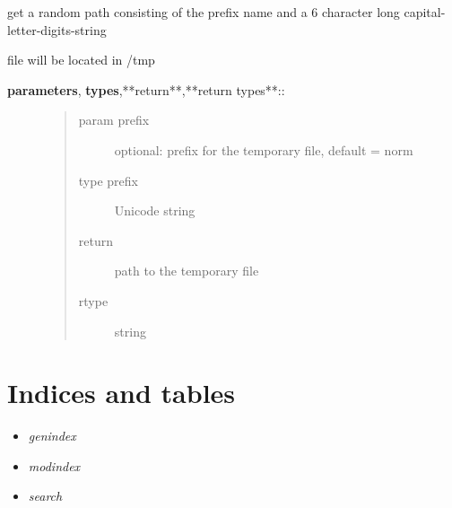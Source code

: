 \documentclass[letterpaper,10pt,english]{sphinxmanual}
\begin{document}

\begin{fulllineitems}
\label{API:norm.util.get_random_tmp_path}
get a random path consisting of the prefix name and a 6 character long capital-letter-digits-string

file will be located in /tmp
\begin{description}
\item[{\textbf{parameters}, \textbf{types},**return**,**return types**::}] \leavevmode\begin{quote}\begin{description}
\item[{param prefix}] \leavevmode
optional: prefix for the temporary file, default = norm

\item[{type prefix}] \leavevmode
Unicode string

\item[{return}] \leavevmode
path to the temporary file

\item[{rtype}] \leavevmode
string

\end{description}\end{quote}

\end{description}

\end{fulllineitems}



\chapter{Indices and tables}
\label{index:indices-and-tables}\begin{itemize}
\item {} 
\emph{genindex}

\item {} 
\emph{modindex}

\item {} 
\emph{search}

\end{itemize}
\end{document}
